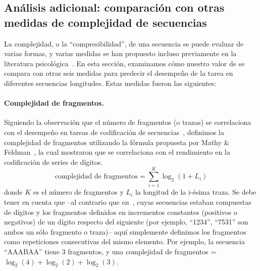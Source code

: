 \subsection{Análisis adicional: comparación con otras medidas de complejidad de secuencias}


La complejidad, o la ``compresibilidad'', de una secuencia se puede evaluar de varias formas, y varias medidas se han propuesto incluso previamente en la literatura psicológica~\cite{f17,f30,f34,f41,f44,f95,f96,f97,f98}. En esta sección, examinamos cómo nuestro valor de \mdlbin se compara con otras seis medidas para predecir el desempeño de la tarea en diferentes secuencias longitudes. Estas medidas fueron las siguientes:


\paragraph{Complejidad de fragmentos.} Siguiendo la observación que el número de fragmentos (o trazas) se correlaciona con el desempeño en tareas de codificación de secuencias~\cite{f34}, definimos la complejidad de fragmentos utilizando la fórmula propuesta por Mathy \& Feldman~\cite{f34}, la cual mostraron que se correlaciona con el rendimiento en la codificación de series de dígitos. 
$$
\text{complejidad de fragmentos} = \sum_{i = 1}^{K} \log_2(1+L_i) 
$$
donde $K$ es el número de fragmentos y $L_i$ la longitud de la i-ésima traza. Se debe tener en cuenta que --al contrario que en~\cite{f34}, cuyas secuencias estaban compuestas de dígitos y los fragmentos definidos en incrementos constantes (positivos o negativos) de un dígito respecto del siguiente (por ejemplo, ``1234'', ``7531'' son ambos un sólo fragmento o traza)-- aquí simplemente definimos los fragmentos como repeticiones consecutivas del mismo elemento. Por ejemplo, la secuencia ``AAABAA'' tiene 3 fragmentos, y una complejidad de fragmentos = $\log_2(4) + \log_2(2) + \log_2(3)$.


